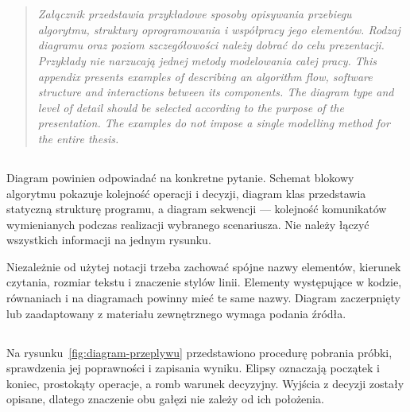 \chapter{}
\label{app:diagramy}

\begin{quote}
\itshape
\ploren
  {Załącznik przedstawia przykładowe sposoby opisywania przebiegu algorytmu, struktury oprogramowania i współpracy jego elementów. Rodzaj diagramu oraz poziom szczegółowości należy dobrać do celu prezentacji. Przykłady nie narzucają jednej metody modelowania całej pracy.}
  {This appendix presents examples of describing an algorithm flow, software structure and interactions between its components. The diagram type and level of detail should be selected according to the purpose of the presentation. The examples do not impose a single modelling method for the entire thesis.}
\end{quote}

\section{}

Diagram powinien odpowiadać na konkretne pytanie. Schemat blokowy algorytmu pokazuje
kolejność operacji i decyzji, diagram klas przedstawia statyczną strukturę programu,
a diagram sekwencji --- kolejność komunikatów wymienianych podczas realizacji wybranego
scenariusza. Nie należy łączyć wszystkich informacji na jednym rysunku.

Niezależnie od użytej notacji trzeba zachować spójne nazwy elementów, kierunek czytania,
rozmiar tekstu i znaczenie stylów linii. Elementy występujące w kodzie, równaniach i na
diagramach powinny mieć te same nazwy. Diagram zaczerpnięty lub zaadaptowany z materiału
zewnętrznego wymaga podania źródła.

\section{}

Na rysunku~\ref{fig:diagram-przeplywu} przedstawiono procedurę pobrania próbki,
sprawdzenia jej poprawności i zapisania wyniku. Elipsy oznaczają początek i koniec,
prostokąty operacje, a romb warunek decyzyjny. Wyjścia z decyzji zostały opisane,
dlatego znaczenie obu gałęzi nie zależy od ich położenia.

